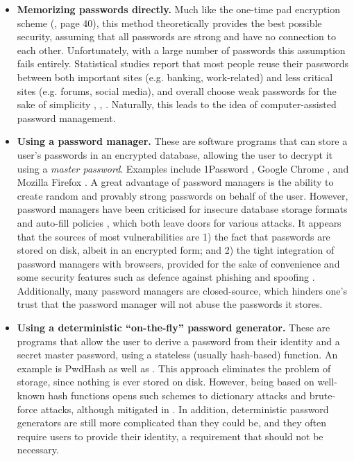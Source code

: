 \documentclass[a4paper, 10pt]{article}
\theoremstyle{plain}
\theoremstyle{definition}
\begin{document}
\begin{itemize}
  \item \textbf{Memorizing passwords directly.} Much like the one-time pad encryption scheme (\cite{serious}, page 40), this method theoretically provides the best possible security, assuming that all passwords are strong and have no connection to each other. Unfortunately, with a large number of passwords this assumption fails entirely. Statistical studies report that most people reuse their passwords between both important sites (e.g. banking, work-related) and less critical sites (e.g. forums, social media), and overall choose weak passwords for the sake of simplicity \cite{large}, \cite{mirkovic}, \cite{again}. Naturally, this leads to the idea of computer-assisted password management.

  \item \textbf{Using a password manager.} These are software programs that can store a user's passwords in an encrypted database, allowing the user to decrypt it using a \emph{master password}. Examples include 1Password \cite{1password}, Google Chrome \cite{google}, and Mozilla Firefox \cite{firefox}. A great advantage of password managers is the ability to create random and provably strong passwords on behalf of the user. However, password managers have been criticised for insecure database storage formats \cite{gasti} and auto-fill policies \cite{attacks}, which both leave doors for various attacks. It appears that the sources of most vulnerabilities are 1) the fact that passwords are stored on disk, albeit in an encrypted form; and 2) the tight integration of password managers with browsers, provided for the sake of convenience and some security features such as defence against phishing and spoofing \cite{ross}. Additionally, many password managers are closed-source, which hinders one's trust that the password manager will not abuse the passwords it stores.

  \item \textbf{Using a deterministic ``on-the-fly'' password generator.} These are programs that allow the user to derive a password from their identity and a secret master password, using a stateless (usually hash-based) function. An example is PwdHash \cite{ross} as well as \cite{jubur}. This approach eliminates the problem of storage, since nothing is ever stored on disk. However, being based on well-known hash functions opens such schemes to dictionary attacks and brute-force attacks, although mitigated in \cite{conv}. In addition, deterministic password generators are still more complicated than they could be, and they often require users to provide their identity, a requirement that should not be necessary.
\end{itemize}
\end{document}

